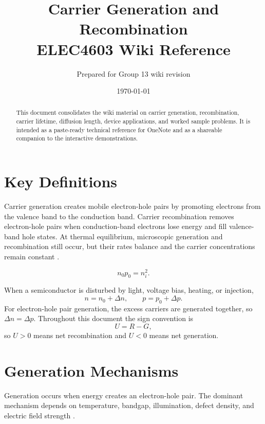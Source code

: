 \documentclass[11pt,a4paper]{article}
\title{Carrier Generation and Recombination\\ELEC4603 Wiki Reference}
\author{Prepared for Group 13 wiki revision}
\date{\today}
\newcommand{\dd}{\Delta}
\newcommand{\nint}{n_i}
\begin{document}
\maketitle

\begin{abstract}
This document consolidates the wiki material on carrier generation, recombination, carrier lifetime, diffusion length, device applications, and worked sample problems. It is intended as a paste-ready technical reference for OneNote and as a shareable companion to the interactive demonstrations.
\end{abstract}

\tableofcontents
\newpage

\section{Key Definitions}

Carrier generation creates mobile electron-hole pairs by promoting electrons from the valence band to the conduction band. Carrier recombination removes electron-hole pairs when conduction-band electrons lose energy and fill valence-band hole states. At thermal equilibrium, microscopic generation and recombination still occur, but their rates balance and the carrier concentrations remain constant \cite{entner2007,sze2007}.

\begin{equation}
  n_0p_0=\nint^2 .
\end{equation}

When a semiconductor is disturbed by light, voltage bias, heating, or injection,
\begin{equation}
  n=n_0+\dd n,\qquad p=p_0+\dd p .
\end{equation}
For electron-hole pair generation, the excess carriers are generated together, so \(\dd n=\dd p\). Throughout this document the sign convention is
\begin{equation}
  U=R-G,
\end{equation}
so \(U>0\) means net recombination and \(U<0\) means net generation.

\section{Generation Mechanisms}

Generation occurs when energy creates an electron-hole pair. The dominant mechanism depends on temperature, bandgap, illumination, defect density, and electric field strength \cite{entner2007,sze2007}.
\end{document}
